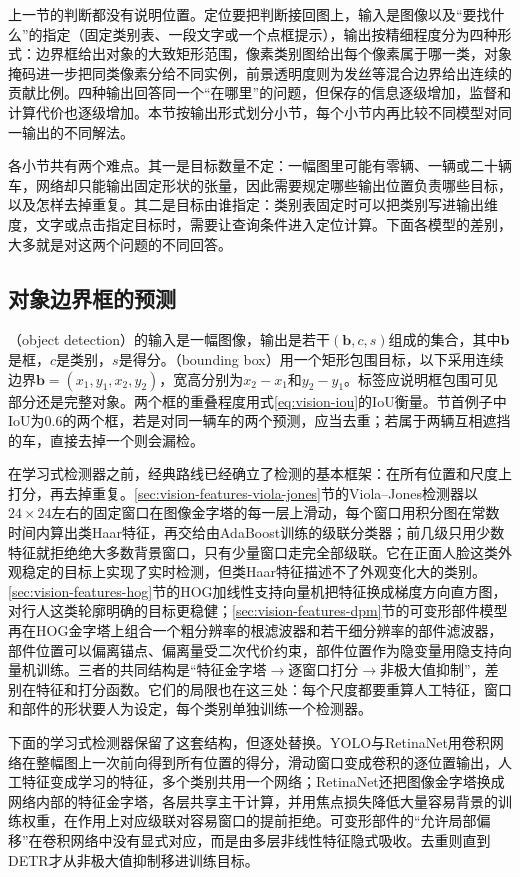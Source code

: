 上一节的判断都没有说明位置。定位要把判断接回图上，输入是图像以及“要找什么”的指定（固定类别表、一段文字或一个点框提示），输出按精细程度分为四种形式：边界框给出对象的大致矩形范围，像素类别图给出每个像素属于哪一类，对象掩码进一步把同类像素分给不同实例，前景透明度则为发丝等混合边界给出连续的贡献比例。四种输出回答同一个“在哪里”的问题，但保存的信息逐级增加，监督和计算代价也逐级增加。本节按输出形式划分小节，每个小节内再比较不同模型对同一输出的不同解法。

各小节共有两个难点。其一是目标数量不定：一幅图里可能有零辆、一辆或二十辆车，网络却只能输出固定形状的张量，因此需要规定哪些输出位置负责哪些目标，以及怎样去掉重复。其二是目标由谁指定：类别表固定时可以把类别写进输出维度，文字或点击指定目标时，需要让查询条件进入定位计算。下面各模型的差别，大多就是对这两个问题的不同回答。

\subsection{对象边界框的预测}
\label{sec:vision-recognition-detection}

（object detection）的输入是一幅图像，输出是若干$(\bm{b},c,s)$组成的集合，其中$\bm{b}$是框，$c$是类别，$s$是得分。（bounding box）用一个矩形包围目标，以下采用连续边界$\bm{b}=(x_1,y_1,x_2,y_2)$，宽高分别为$x_2-x_1$和$y_2-y_1$。标签应说明框包围可见部分还是完整对象。两个框的重叠程度用式\eqref{eq:vision-iou}的IoU衡量。节首例子中IoU为0.6的两个框，若是对同一辆车的两个预测，应当去重；若属于两辆互相遮挡的车，直接去掉一个则会漏检。

在学习式检测器之前，经典路线已经确立了检测的基本框架：在所有位置和尺度上打分，再去掉重复。\ref{sec:vision-features-viola-jones}节的Viola–Jones检测器以$24\times24$左右的固定窗口在图像金字塔的每一层上滑动，每个窗口用积分图在常数时间内算出类Haar特征，再交给由AdaBoost训练的级联分类器；前几级只用少数特征就拒绝绝大多数背景窗口，只有少量窗口走完全部级联。它在正面人脸这类外观稳定的目标上实现了实时检测，但类Haar特征描述不了外观变化大的类别。\ref{sec:vision-features-hog}节的HOG加线性支持向量机把特征换成梯度方向直方图，对行人这类轮廓明确的目标更稳健；\ref{sec:vision-features-dpm}节的可变形部件模型再在HOG金字塔上组合一个粗分辨率的根滤波器和若干细分辨率的部件滤波器，部件位置可以偏离锚点、偏离量受二次代价约束，部件位置作为隐变量用隐支持向量机训练。三者的共同结构是“特征金字塔$\to$逐窗口打分$\to$非极大值抑制”，差别在特征和打分函数。它们的局限也在这三处：每个尺度都要重算人工特征，窗口和部件的形状要人为设定，每个类别单独训练一个检测器。

下面的学习式检测器保留了这套结构，但逐处替换。YOLO与RetinaNet用卷积网络在整幅图上一次前向得到所有位置的得分，滑动窗口变成卷积的逐位置输出，人工特征变成学习的特征，多个类别共用一个网络；RetinaNet还把图像金字塔换成网络内部的特征金字塔，各层共享主干计算，并用焦点损失降低大量容易背景的训练权重，在作用上对应级联对容易窗口的提前拒绝。可变形部件的“允许局部偏移”在卷积网络中没有显式对应，而是由多层非线性特征隐式吸收。去重则直到DETR才从非极大值抑制移进训练目标。

